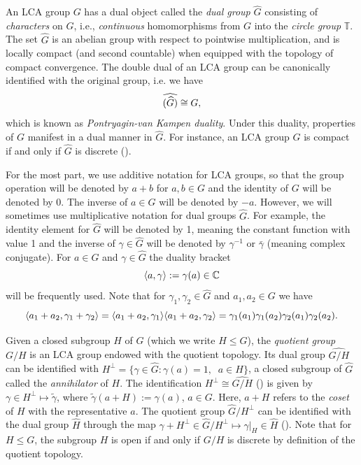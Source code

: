 \documentclass[12pt,reqno]{amsart}
\theoremstyle{definition}
\theoremstyle{definition}
\theoremstyle{definition}
\numberwithin{thm}{section}
\numberwithin{equation}{section}
\newcommand{\la}{\langle}
\newcommand{\ra}{\rangle}
\newcommand{\Comp}{\mathbb{C}}
\newcommand{\tor}{\mathbb{T}}
\newcommand{\wh}[1]{\widehat{#1}}
\begin{document}
An LCA group $G$ has a dual object called the {\em dual group} $\wh{G}$ consisting of {\em characters} on $G$, i.e., {\em continuous} homomorphisms from $G$ into the {\em circle group} $\tor$. The set $\wh{G}$ is an abelian group with respect to pointwise multiplication, and is locally compact (and second countable) when equipped with the topology of compact convergence. The double dual of an LCA group can be canonically identified with the original group, i.e. we have
    \begin{equation} \notag
        \wh{(\wh{G})} \cong G,
    \end{equation}
    which is known as {\em Pontryagin-van Kampen duality}. Under this duality, properties of $G$ manifest in a dual manner in $\wh{G}$. For instance, an LCA group $G$ is compact if and only if $\wh{G}$ is discrete (\cite[23.17]{HewittRoss}).

For the most part, we use additive notation for LCA groups, so that the group operation will be denoted by $a+b$ for $a,b\in G$ and the identity of $G$ will be denoted by 0. The inverse of $a\in G$ will be denoted by $-a$. However, we will sometimes use multiplicative notation for dual groups $\wh{G}$. For example, the identity element for $\wh{G}$ will be denoted by 1, meaning the constant function with value 1 and the inverse of $\gamma \in \wh{G}$ will be denoted by $\gamma^{-1}$ or $\bar{\gamma}$ (meaning complex conjugate). For $a\in G$ and $\gamma \in \wh{G}$ the duality bracket
\begin{equation} \notag
    \la a, \gamma \ra := \gamma(a) \in \Comp
\end{equation}
will be frequently used. Note that for $\gamma_1, \gamma_2 \in \wh{G}$ and $a_1, a_2\in G$ we have
\begin{equation} \notag
    \la a_1 + a_2, \gamma_1 + \gamma_2 \ra = \la a_1 + a_2, \gamma_1 \ra \la a_1 + a_2, \gamma_2 \ra = \gamma_1(a_1)\gamma_1(a_2)\gamma_2(a_1)\gamma_2(a_2).
\end{equation}


Given a closed subgroup $H$ of $G$ (which we write $H\le G$), the {\em quotient group} $G/H$ is an LCA group endowed with the quotient topology. Its dual group $\wh{G/H}$ can be identified with $H^\perp = \{\gamma \in \wh{G}: \gamma(a) = 1,\;\; a\in H\}$, a closed subgroup of $\wh{G}$ called the {\em annihilator} of $H$.
The identification $H^\perp \cong \wh{G/H}$ (\cite[Theorem 4.39]{Folland-book}) is given by $\gamma \in H^\perp \mapsto \tilde{\gamma}$, where $\tilde{\gamma}(a+H) := \gamma(a)$, $a\in G$. Here, $a+H$ refers to the {\em coset} of $H$ with the representative $a$.
The quotient group $\wh{G}/H^\perp$ can be identified with the dual group $\wh{H}$ through the map $\gamma + H^\perp \in \wh{G}/H^\perp \mapsto \gamma|_H \in \wh{H}$ (\cite[Theorem 4.39]{Folland-book}).
Note that for $H\le G$, the subgroup $H$ is open if and only if $G/H$ is discrete by definition of the quotient topology.
\end{document}
